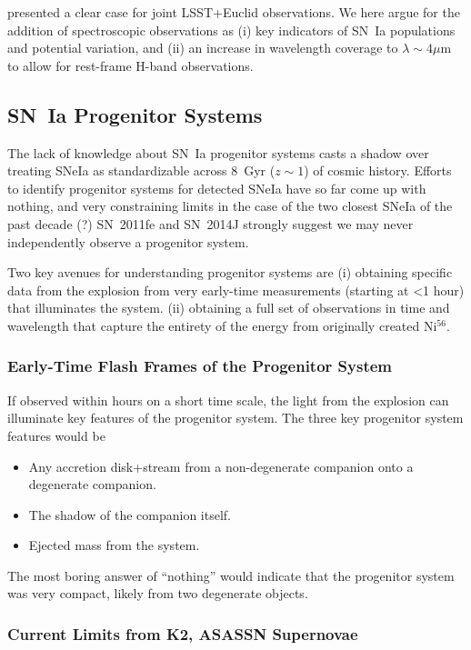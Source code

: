 \citet{Astier16} presented a clear case for joint LSST+Euclid observations.  We here argue for the addition of spectroscopic observations as (i) key indicators of SN~Ia populations and potential variation, and (ii) an increase in wavelength coverage to $\lambda\sim4\mu$m to allow for rest-frame H-band observations.

\subsection{SN~Ia Progenitor Systems}

The lack of knowledge about SN~Ia progenitor systems casts a shadow over treating SNeIa as standardizable across 8~Gyr ($z\sim1$) of cosmic history.  Efforts to identify progenitor systems for detected SNeIa have so far come up with nothing, and very constraining limits in the case of the two closest SNeIa of the past decade (?) SN~2011fe \citep{??} and SN~2014J \citep{??} strongly suggest we may never independently observe a progenitor system.

Two key avenues for understanding progenitor systems are 
(i) obtaining specific data from the explosion from very early-time measurements (starting at <1 hour) that illuminates the system.
(ii) obtaining a full set of observations in time and wavelength that capture the entirety of the energy from originally created Ni$^{56}$.

\subsubsection{Early-Time Flash Frames of the Progenitor System}
If observed within hours on a short time scale, the light from the explosion can illuminate key features of the progenitor system.  The three key progenitor system features would be 
\begin{itemize}
\item Any accretion disk+stream from a non-degenerate companion onto a degenerate companion.
\item The shadow of the companion itself.
\item Ejected mass from the system.
\end{itemize}

The most boring answer of ``nothing'' would indicate that the progenitor system was very compact, likely from two degenerate objects.  

\subsubsection{Current Limits from K2, ASASSN Supernovae}

